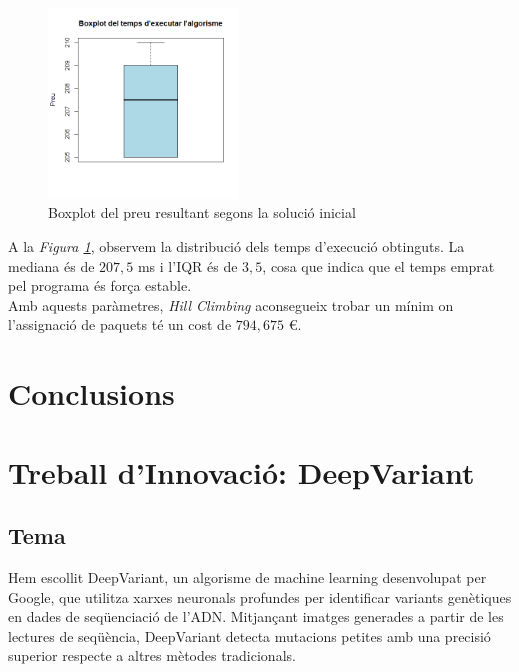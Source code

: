 \documentclass[a4paper]{article}
\begin{document}
	\begin{figure}[H]
		\centering
		\includegraphics[width=0.45\textwidth]{images/exp9_boxplot.png}
		\caption{Boxplot del preu resultant segons la solució inicial}
		\label{fig:exp9_boxplot}
	\end{figure}
	
	A la \textit{Figura \ref{fig:exp9_boxplot}}, observem la distribució dels temps d'execució obtinguts. La mediana és de $207,5$ ms i l'IQR és de $3,5$, cosa que indica que el temps emprat pel programa és força estable. \\
	
	Amb aquests paràmetres, \textit{Hill Climbing} aconsegueix trobar un mínim on l'assignació de paquets té un cost de $794,675$ €.
	
	\newpage
	\section{Conclusions}
	
	
	\newpage
	\section{Treball d'Innovació: DeepVariant}
	
	\subsection{Tema}
	Hem escollit DeepVariant, un algorisme de machine learning desenvolupat per Google, que utilitza xarxes neuronals profundes per identificar variants genètiques en dades de seqüenciació de l'ADN. Mitjançant imatges generades a partir de les lectures de seqüència, DeepVariant detecta mutacions petites amb una precisió superior respecte a altres mètodes tradicionals.
	
\end{document}
